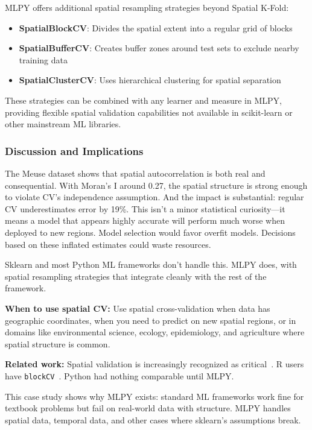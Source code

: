 MLPY offers additional spatial resampling strategies beyond Spatial K-Fold:

\begin{itemize}
\item \textbf{SpatialBlockCV}: Divides the spatial extent into a regular grid of blocks
\item \textbf{SpatialBufferCV}: Creates buffer zones around test sets to exclude nearby training data
\item \textbf{SpatialClusterCV}: Uses hierarchical clustering for spatial separation
\end{itemize}

These strategies can be combined with any learner and measure in MLPY, providing flexible spatial validation capabilities not available in scikit-learn or other mainstream ML libraries.

\subsubsection{Discussion and Implications}

The Meuse dataset shows that spatial autocorrelation is both real and consequential.
With Moran's I around 0.27, the spatial structure is strong enough to violate
CV's independence assumption. And the impact is substantial: regular CV
underestimates error by 19\%. This isn't a minor statistical curiosity---it
means a model that appears highly accurate will perform much worse when deployed
to new regions. Model selection would favor overfit models. Decisions based on
these inflated estimates could waste resources.

Sklearn and most Python ML frameworks don't handle this. MLPY does, with
spatial resampling strategies that integrate cleanly with the rest of the
framework.

\textbf{When to use spatial CV:} Use spatial cross-validation when data has
geographic coordinates, when you need to predict on new spatial regions, or
in domains like environmental science, ecology, epidemiology, and agriculture
where spatial structure is common.

\textbf{Related work:} Spatial validation is increasingly recognized as
critical~\citep{roberts2017cross, meyer2018improving, ploton2020spatial}.
R users have \texttt{blockCV}~\citep{valavi2019blockcv}. Python had nothing
comparable until MLPY.

This case study shows why MLPY exists: standard ML frameworks work fine for
textbook problems but fail on real-world data with structure. MLPY handles
spatial data, temporal data, and other cases where sklearn's assumptions break.
